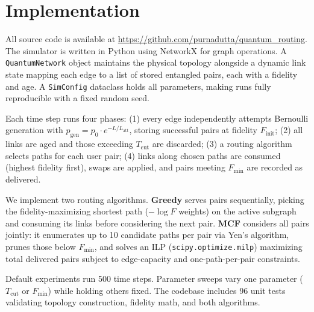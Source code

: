 \section{Implementation}
\label{sec:implementation}

All source code is available at \url{https://github.com/purnadutta/quantum_routing}. The simulator is written in Python using NetworkX for graph operations. A \texttt{QuantumNetwork} object maintains the physical topology alongside a dynamic link state mapping each edge to a list of stored entangled pairs, each with a fidelity and age. A \texttt{SimConfig} dataclass holds all parameters, making runs fully reproducible with a fixed random seed.

Each time step runs four phases: (1) every edge independently attempts Bernoulli generation with $p_\text{gen} = p_0 \cdot e^{-L/L_\text{att}}$, storing successful pairs at fidelity $F_\text{init}$; (2) all links are aged and those exceeding $T_\text{cut}$ are discarded; (3) a routing algorithm selects paths for each user pair; (4) links along chosen paths are consumed (highest fidelity first), swaps are applied, and pairs meeting $F_\text{min}$ are recorded as delivered.

We implement two routing algorithms. \textbf{Greedy} serves pairs sequentially, picking the fidelity-maximizing shortest path ($-\log F$ weights) on the active subgraph and consuming its links before considering the next pair. \textbf{MCF} considers all pairs jointly: it enumerates up to 10 candidate paths per pair via Yen's algorithm, prunes those below $F_\text{min}$, and solves an ILP (\texttt{scipy.optimize.milp}) maximizing total delivered pairs subject to edge-capacity and one-path-per-pair constraints.

Default experiments run 500 time steps. Parameter sweeps vary one parameter ($T_\text{cut}$ or $F_\text{min}$) while holding others fixed. The codebase includes 96 unit tests validating topology construction, fidelity math, and both algorithms.
